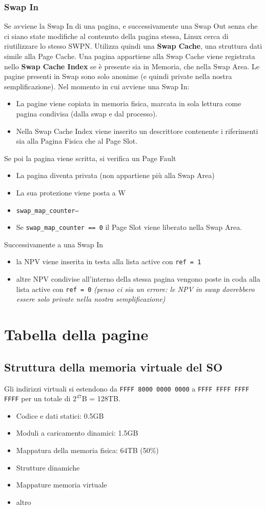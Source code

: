 \documentclass[12pt, a4paper]{report}
\begin{document}
\subsection{Swap In}
Se avviene la Swap In di una pagina, e successivamente una Swap Out senza che ci
siano state modifiche al contenuto della pagina stessa, Linux cerca di
riutilizzare lo stesso SWPN. Utilizza quindi una \textbf{Swap Cache}, una
struttura dati simile alla Page Cache. Una pagina appartiene alla Swap Cache
viene registrata nello \textbf{Swap Cache Index} se è presente sia in Memoria,
che nella Swap Area.
Le pagine presenti in Swap sono solo anonime (e quindi private nella nostra
semplificazione). Nel momento in cui avviene una Swap In:
\begin{itemize}
	\item La pagine viene copiata in memoria fisica, marcata in sola lettura
		come pagina condivisa (dalla swap e dal processo).
	\item Nella Swap Cache Index viene inserito un descrittore contenente i
		riferimenti sia alla Pagina Fisica che al Page Slot.
\end{itemize}
Se poi la pagina viene scritta, si verifica un Page Fault
\begin{itemize}
	\item La pagina diventa privata (non appartiene più alla Swap Area)
	\item La sua protezione viene posta a W
	\item \texttt{swap\_map\_counter--}
	\item Se \texttt{swap\_map\_counter == 0} il Page Slot viene liberato nella
		Swap Area.
\end{itemize}
Successivamente a una Swap In
\begin{itemize}
	\item la NPV viene inserita in testa alla lista active con \texttt{ref = 1}
	\item altre NPV condivise all'interno della stessa pagina vengono poste in
		coda alla lista active con \texttt{ref = 0} \textit{(penso ci sia un
		errore: le NPV in swap dovrebbero essere solo private nella nostra
		semplificazione)}
\end{itemize}

\chapter{Tabella della pagine}
\section{Struttura della memoria virtuale del SO}
Gli indirizzi virtuali si estendono da \texttt{FFFF 8000 0000 0000} a
\texttt{FFFF FFFF FFFF FFFF} per un totale di $2^{47}$B = 128TB.
\begin{itemize}
	\item Codice e dati statici: 0.5GB
	\item Moduli a caricamento dinamici: 1.5GB
	\item Mappatura della memoria fisica: 64TB (50\%)
	\item Strutture dinamiche
	\item Mappature memoria virtuale
	\item altro
\end{itemize}
\end{document}
